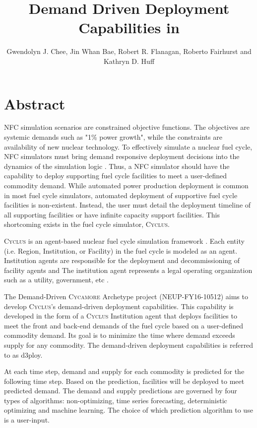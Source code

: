 \documentclass{anstrans}
\title{Demand Driven Deployment Capabilities in \Cyclus}
\author{Gwendolyn J. Chee, Jin Whan Bae, Robert R. Flanagan, Roberto Fairhurst and Kathryn D. Huff}
\institute{
Dept. of Nuclear, Plasma and Radiological Engineering, University of Illinois at Urbana-Champaign \\
gchee2@illinois.edu
}
\newcommand{\Cyclus}{\textsc{Cyclus}\xspace}%
\newcommand{\Cycamore}{\textsc{Cycamore}\xspace}%
\begin{document}
\section{Abstract}
\gls{NFC} simulation scenarios are constrained objective functions. 
The objectives are systemic demands such as "1\% power growth", while the 
constraints are availability of new nuclear technology. 
To effectively simulate a nuclear fuel cycle, \gls{NFC} simulators 
must bring demand responsive deployment decisions into the dynamics of the 
simulation logic \cite{huff_current_2017}. 
Thus, a \gls{NFC} simulator should have the capability to deploy 
supporting fuel cycle facilities to meet a user-defined commodity demand. 
While automated power production deployment is common in most fuel cycle simulators, automated deployment of supportive fuel cycle 
facilities is non-existent. 
Instead, the user must detail the deployment timeline of all supporting 
facilities or have infinite capacity support facilities. This shortcoming 
exists in the fuel cycle simulator, \Cyclus. 

\Cyclus is an agent-based nuclear fuel cycle simulation framework 
\cite{huff_fundamental_2016}. 
Each entity (i.e. Region, Institution, or Facility) in the fuel cycle is modeled 
as an agent. 
Institution agents
are responsible for the deployment and decommissioning of facility agents and
The institution agent represents a legal operating organization such as a 
utility, government, etc \cite{huff_fundamental_2016}. 

The Demand-Driven \Cycamore Archetype project (NEUP-FY16-10512) aims to 
develop \Cyclus's demand-driven deployment capabilities. 
This capability is developed in the form of a \Cyclus Institution agent that 
deploys facilities to meet the front and back-end demands of the fuel cycle 
based on a user-defined commodity demand. 
Its goal is to minimize the time where demand exceeds supply for any commodity.
The demand-driven deployment capabilities is referred to as d3ploy. 

At each time step, demand and supply for each commodity is predicted for the 
following time step. Based on the prediction, facilities will be deployed to 
meet predicted demand. 
The demand and supply predictions are governed by four types of algorithms: 
non-optimizing, time series forecasting, deterministic optimizing and machine 
learning. 
The choice of which prediction algorithm to use is a user-input. 
\end{document}
